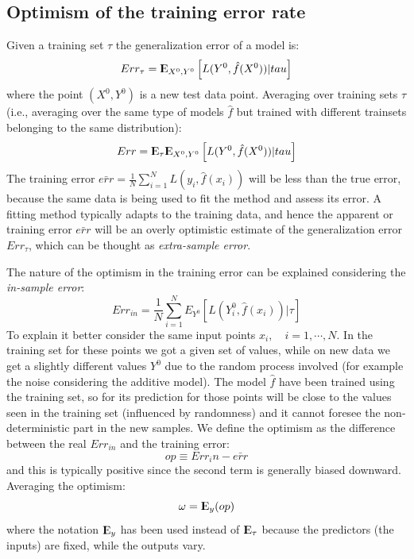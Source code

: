 \documentclass[12pt, letterpaper]{article}
\theoremstyle{definition}
\newcommand{\E}{{\rm I\kern-.3em E}}
\begin{document}
\subsection{Optimism of the training error rate}
Given a training set $\tau$ the generalization error of a model is:
\begin{equation}
Err_\tau = \E_{X^0, Y^0}\left[ L(Y^0, \hat{f}(X^0))|tau\right]
\end{equation}
where the point $(X^0, Y^0)$ is a new test data point. Averaging over training sets $\tau$ (i.e., averaging over the same type of models $\hat{f}$ but trained with different trainsets belonging to the same distribution):
\begin{equation}
Err = \E_\tau \E_{X^0, Y^0}\left[ L(Y^0, \hat{f}(X^0))|tau\right]
\end{equation}
The training error $\bar{err} = \frac{1}{N}\sum_{i=1}^N L(y_i, \hat{f}(x_i))$  will be less than the true error, because the same data is being used to fit the method and assess its error. A fitting method typically adapts to the training data, and hence the apparent or training error $\bar{err}$ will be an overly optimistic estimate of the generalization error $Err_\tau$, which can be thought as \textit{extra-sample error}. 

The nature of the optimism in the training error can be explained considering the \textit{in-sample error}:
\begin{equation}
Err_{in} = \frac{1}{N} \sum_{i=1}^N E_{Y^0}\left[ L(Y_i^0, \hat{f}(x_i))|\tau\right]
\end{equation}
To explain it better consider the same input points $x_i, \quad i=1,\cdots, N$. In the training set for these points we got a given set of values, while on new data we get a slightly different values $Y^0$ due to the random process involved (for example the noise considering the additive model). The model $\hat{f}$ have been trained using the training set, so for its prediction for those points will be close to the values seen in the training set (influenced by randomness) and it cannot foresee the non-deterministic part in the new samples. We define the optimism as the difference between the real $Err_{in}$ and the training error:
\begin{equation}
op \equiv Err_in - \bar{err}
\end{equation} 
and this is typically positive since the second term is generally biased downward. Averaging the optimism:
\begin{equation}
\omega = \E_y(op)
\end{equation}
where the notation $\E_y$ has been used instead of $\E_\tau$ because the predictors (the inputs) are fixed, while the outputs vary.
\end{document}
